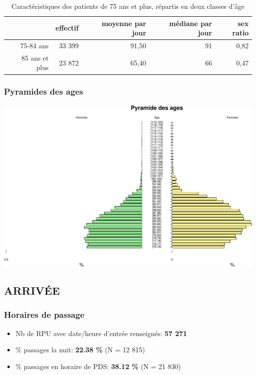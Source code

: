 \documentclass[]{article}
\begin{document}
\begin{table}[ht]
\centering
\begin{tabular}{rrrrr}
  \hline
 & effectif & moyenne par jour  & médiane par jour & sex ratio \\ 
  \hline
75-84 ans & 33 399 & 91,50 &  91 & 0,82 \\ 
  85 ans et plus & 23 872 & 65,40 &  66 & 0,47 \\ 
   \hline
\end{tabular}
\caption{Caractéristiques des patients de 75 ans et plus, répartis en deux classes d'âge} 
\end{table}

\subsubsection{Pyramides des ages}\label{pyramides-des-ages}

\includegraphics{Figs/unnamed-chunk-13-1.pdf}

\subsection{ARRIVÉE}\label{arrivee-1}

\subsubsection{Horaires de passage}\label{horaires-de-passage-1}

\begin{itemize}
\itemsep1pt\parskip0pt
\item
  Nb de RPU avec date/heure d'entrée renseignés: \textbf{57 271}
\item
  \% passages la nuit: \textbf{22.38 \%} (N = 12 815)
\item
  \% passages en horaire de PDS: \textbf{38.12 \%} (N = 21 830)
\end{itemize}
\end{document}
